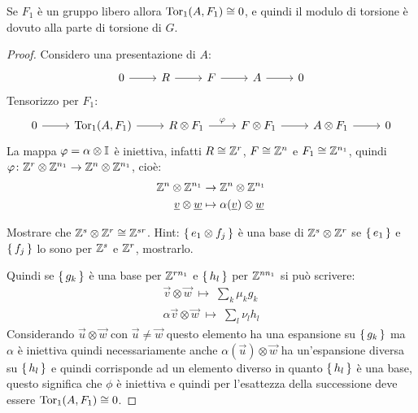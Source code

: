 \begin{lemma}
  Se $ F_1 $ è un gruppo libero allora $ \mathrm{Tor_1}( A,F_1) \cong 0 $, e quindi il modulo
  di torsione è dovuto alla parte di torsione di $ G $.
\end{lemma}
\begin{proof}
  Considero una presentazione di $ A $:
  \[
    \begin{tikzcd}
      0 \rar & R \rar & F \rar & A \rar & 0
    \end{tikzcd}
  \]
  Tensorizzo per $ F_1 $:
  \[
    \begin{tikzcd}
      0 \rar & \tor{A,F_1} \rar & R \otimes F_1 \rar{\phi} & F \otimes F_1 \rar & A \otimes F_1 \rar & 0
    \end{tikzcd}
  \]
  La mappa $ \varphi = \alpha \otimes \mathbb{I}_{} $ è iniettiva, infatti $ R \cong \mathbb{Z}^r $, $ F \cong \mathbb{Z}^n $ e $ F_1 \cong \mathbb{Z}^{n_1} $,
  quindi $ \varphi \colon \mathbb{Z}^r \otimes \mathbb{Z}^{n_1} \to \mathbb{Z}^n \otimes \mathbb{Z}^{n_1} $, cioè:
  \begin{align*}
    \mathbb{Z}^n \otimes \mathbb{Z}^{n_1} & \to  \mathbb{Z}^n \otimes \mathbb{Z}^{n_1} \\
    \underline{v} \otimes \underline{w} & \mapsto \alpha(\underline{v}) \otimes \underline{w}
  \end{align*}
  \vspace*{-20pt}
  \begin{exercise}
    Mostrare che $ \mathbb{Z}^s \otimes \mathbb{Z}^r \cong \mathbb{Z}^{sr} $.
    Hint:  $ \set{e_1 \otimes f_j} $ è una base di $ \mathbb{Z}^s \otimes \mathbb{Z}^r $ se $ \set{e_1} $
    e $ \set{f_j} $ lo sono per $ \mathbb{Z}^s $ e $ \mathbb{Z}^r $, mostrarlo.
  \end{exercise}
  Quindi se $ \set{g_k} $ è una base per $ \mathbb{Z}^{rn_1} $ e $ \set{h_l} $ per $ \mathbb{Z}^{nn_1} $
  si può scrivere:
  \begin{gather*}
     \vec{v} \otimes \vec{w} \; \mapsto \; \sum_k \mu_k g_k \\
     \alpha{\vec{v}} \otimes \vec{w} \; \mapsto \; \sum_l \nu_l h_l
   \end{gather*}
   Considerando $ \vec{u} \otimes \vec{w} $ con $ \vec{u} \not = \vec{w} $ questo
   elemento ha una espansione su $ \set{g_k} $ ma $ \alpha $ è iniettiva quindi
   necessariamente anche $ \alpha({\vec{u}}) \otimes \vec{w} $ ha un'espansione diversa su
   $ \set{h_l} $ e quindi corrisponde ad un elemento diverso in quanto
   $ \set{h_l} $ è una base, questo significa che $ \phi $ è iniettiva e quindi per
   l'esattezza della successione deve essere $ \mathrm{Tor_1}( A, F_1) \cong 0 $.
\end{proof}

